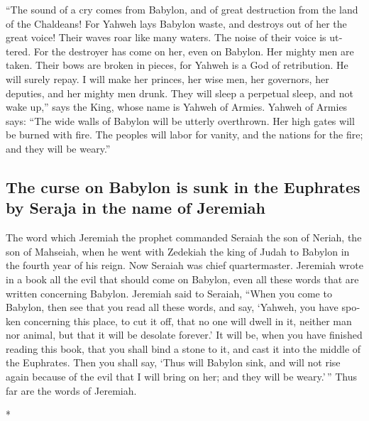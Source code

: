 \begin{paracol}{2}
\begin{otherlanguage}{english}
 ``The sound of a cry comes from Babylon, and of great
destruction from the land of the Chaldeans!  For Yahweh
lays Babylon waste, and destroys out of her the great voice! Their waves
roar like many waters. The noise of their voice is uttered.
 For the destroyer has come on her, even on Babylon. Her
mighty men are taken. Their bows are broken in pieces, for Yahweh is a
God of retribution. He will surely repay.  I will make
her princes, her wise men, her governors, her deputies, and her mighty
men drunk. They will sleep a perpetual sleep, and not wake up,'' says
the King, whose name is Yahweh of Armies.  Yahweh of
Armies says: ``The wide walls of Babylon will be utterly overthrown. Her
high gates will be burned with fire. The peoples will labor for vanity,
and the nations for the fire; and they will be weary.''

\hypertarget{the-curse-on-babylon-is-sunk-in-the-euphrates-by-seraja-in-the-name-of-jeremiah}{%
\subsection{The curse on Babylon is sunk in the Euphrates by Seraja in
the name of
Jeremiah}\label{the-curse-on-babylon-is-sunk-in-the-euphrates-by-seraja-in-the-name-of-jeremiah}}

 The word which Jeremiah the prophet commanded Seraiah
the son of Neriah, the son of Mahseiah, when he went with Zedekiah the
king of Judah to Babylon in the fourth year of his reign. Now Seraiah
was chief quartermaster.  Jeremiah wrote in a book all
the evil that should come on Babylon, even all these words that are
written concerning Babylon.  Jeremiah said to Seraiah,
``When you come to Babylon, then see that you read all these words,
 and say, `Yahweh, you have spoken concerning this place,
to cut it off, that no one will dwell in it, neither man nor animal, but
that it will be desolate forever.'  It will be, when you
have finished reading this book, that you shall bind a stone to it, and
cast it into the middle of the Euphrates.  Then you shall
say, `Thus will Babylon sink, and will not rise again because of the
evil that I will bring on her; and they will be weary.'\,'' Thus far are
the words of Jeremiah.

\end{otherlanguage}

\switchcolumn[0]*


\end{paracol}
